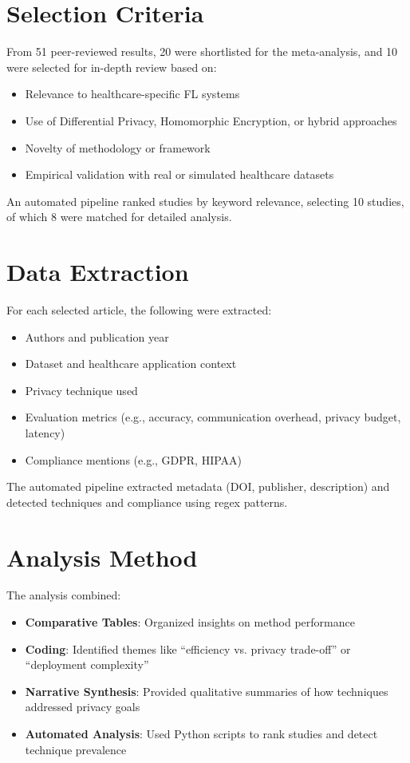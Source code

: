 \documentclass[12pt]{report}
\begin{document}
\section{Selection Criteria}
From 51 peer-reviewed results, 20 were shortlisted for the meta-analysis, and 10 were selected for in-depth review based on:
\begin{itemize}
    \item Relevance to healthcare-specific FL systems
    \item Use of Differential Privacy, Homomorphic Encryption, or hybrid approaches
    \item Novelty of methodology or framework
    \item Empirical validation with real or simulated healthcare datasets
\end{itemize}
An automated pipeline ranked studies by keyword relevance, selecting 10 studies, of which 8 were matched for detailed analysis.

\section{Data Extraction}
For each selected article, the following were extracted:
\begin{itemize}
    \item Authors and publication year
    \item Dataset and healthcare application context
    \item Privacy technique used
    \item Evaluation metrics (e.g., accuracy, communication overhead, privacy budget, latency)
    \item Compliance mentions (e.g., GDPR, HIPAA)
\end{itemize}
The automated pipeline extracted metadata (DOI, publisher, description) and detected techniques and compliance using regex patterns.

\section{Analysis Method}
The analysis combined:
\begin{itemize}
    \item \textbf{Comparative Tables}: Organized insights on method performance
    \item \textbf{Coding}: Identified themes like ``efficiency vs. privacy trade-off'' or ``deployment complexity''
    \item \textbf{Narrative Synthesis}: Provided qualitative summaries of how techniques addressed privacy goals
    \item \textbf{Automated Analysis}: Used Python scripts to rank studies and detect technique prevalence
\end{itemize}
\end{document}
